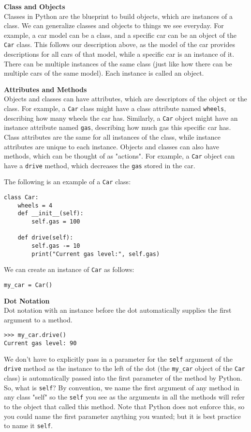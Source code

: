 \textbf{Class and Objects} \\
Classes in Python are the blueprint to build objects, which are instances of a class. We can generalize classes and objects to things we see everyday. For example, a car model can be a class, and a specific car can be an object of the \lstinline{Car} class. This follows our description above, as the model of the car provides descriptions for all cars of that model, while a specific car is an instance of it. There can be multiple instances of the same class (just like how there can be multiple cars of the same model). Each instance is called an object.

\textbf{Attributes and Methods} \\
Objects and classes can have attributes, which are descriptors of the object or the class. For example, a \lstinline{Car} class might have a class attribute named \lstinline{wheels}, describing how many wheels the car has. Similarly, a \lstinline{Car} object might have an instance attribute named \lstinline{gas}, describing how much gas this specific car has. Class attributes are the same for all instances of the class, while instance attributes are unique to each instance. Objects and classes can also have methods, which can be thought of as "actions". For example, a \lstinline{Car} object can have a \lstinline{drive} method, which decreases the \lstinline{gas} stored in the car.

The following is an example of a \lstinline{Car} class:
\begin{lstlisting}
class Car:
    wheels = 4
    def __init__(self):
        self.gas = 100

    def drive(self):
        self.gas -= 10
        print("Current gas level:", self.gas)
\end{lstlisting}

We can create an instance of \lstinline{Car} as follows:
\begin{lstlisting}
my_car = Car()
\end{lstlisting}

\textbf{Dot Notation} \\
Dot notation with an instance before the dot automatically supplies the first argument to a method.
\begin{lstlisting}
>>> my_car.drive()
Current gas level: 90
\end{lstlisting}
\hfill \break
We don’t have to explicitly pass in a parameter for the \lstinline{self} argument of the \lstinline{drive} method as the instance to the left of the dot (the \lstinline{my_car} object of the \lstinline{Car} class) is automatically passed into the first parameter of the method by Python. So, what is \lstinline{self}? By convention, we name the first argument of any method in any class "self" so the \lstinline{self} you see as the arguments in all the methods will refer to the object that called this method. Note that Python does not enforce this, so you could name the first parameter anything you wanted; but it is best practice to name it \lstinline{self}.


